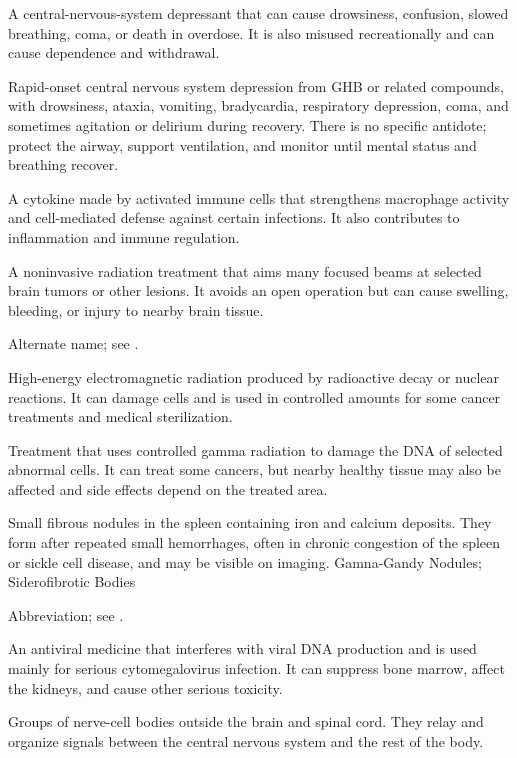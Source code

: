  A central-nervous-system depressant that can cause drowsiness, confusion, slowed breathing, coma, or death in overdose. It is also misused recreationally and can cause dependence and withdrawal.

 Rapid-onset central nervous system depression from GHB or related compounds, with drowsiness, ataxia, vomiting, bradycardia, respiratory depression, coma, and sometimes agitation or delirium during recovery. There is no specific antidote; protect the airway, support ventilation, and monitor until mental status and breathing recover.

 A cytokine made by activated immune cells that strengthens macrophage activity and cell-mediated defense against certain infections. It also contributes to inflammation and immune regulation.

 A noninvasive radiation treatment that aims many focused beams at selected brain tumors or other lesions. It avoids an open operation but can cause swelling, bleeding, or injury to nearby brain tissue.

 Alternate name; see .

 High-energy electromagnetic radiation produced by radioactive decay or nuclear reactions. It can damage cells and is used in controlled amounts for some cancer treatments and medical sterilization.

 Treatment that uses controlled gamma radiation to damage the DNA of selected abnormal cells. It can treat some cancers, but nearby healthy tissue may also be affected and side effects depend on the treated area.

 Small fibrous nodules in the spleen containing iron and calcium deposits. They form after repeated small hemorrhages, often in chronic congestion of the spleen or sickle cell disease, and may be visible on imaging.
\synonyms
Gamna-Gandy Nodules; Siderofibrotic Bodies

 Abbreviation; see .

 An antiviral medicine that interferes with viral DNA production and is used mainly for serious cytomegalovirus infection. It can suppress bone marrow, affect the kidneys, and cause other serious toxicity.

 Groups of nerve-cell bodies outside the brain and spinal cord. They relay and organize signals between the central nervous system and the rest of the body.

